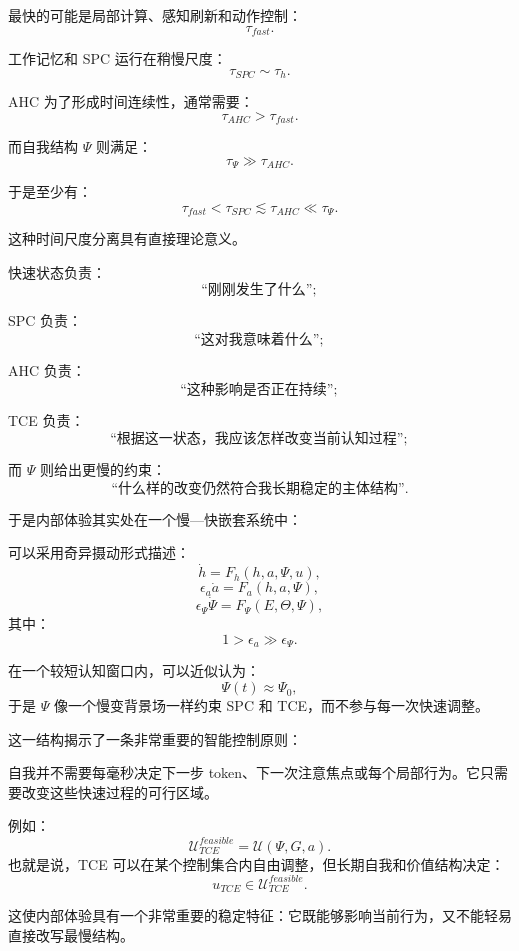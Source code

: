 最快的可能是局部计算、感知刷新和动作控制：
\[
\tau_{fast}.
\]

工作记忆和 SPC 运行在稍慢尺度：
\[
\tau_{SPC}
\sim
\tau_h.
\]

AHC 为了形成时间连续性，通常需要：
\[
\tau_{AHC}
>
\tau_{fast}.
\]

而自我结构 $\Psi$ 则满足：
\[
\tau_{\Psi}
\gg
\tau_{AHC}.
\]

于是至少有：
\[
\boxed{
\tau_{fast}
<
\tau_{SPC}
\lesssim
\tau_{AHC}
\ll
\tau_{\Psi}.
}
\]

这种时间尺度分离具有直接理论意义。

快速状态负责：
\[
\text{``刚刚发生了什么''};
\]

SPC 负责：
\[
\text{``这对我意味着什么''};
\]

AHC 负责：
\[
\text{``这种影响是否正在持续''};
\]

TCE 负责：
\[
\text{``根据这一状态，我应该怎样改变当前认知过程''};
\]

而 $\Psi$ 则给出更慢的约束：
\[
\text{``什么样的改变仍然符合我长期稳定的主体结构''}.
\]

于是内部体验其实处在一个慢—快嵌套系统中：
\begin{statementbox}
\centering
{}
\end{statementbox}

可以采用奇异摄动形式描述：
\[
\dot h
=
F_h
(h,a,\Psi,u),
\]
\[
\epsilon_a\dot a
=
F_a
(h,a,\Psi),
\]
\[
\epsilon_\Psi\dot\Psi
=
F_\Psi
(E,\Theta,\Psi),
\]
其中：
\[
1
>
\epsilon_a
\gg
\epsilon_\Psi.
\]

在一个较短认知窗口内，可以近似认为：
\[
\Psi(t)\approx\Psi_0,
\]
于是 $\Psi$ 像一个慢变背景场一样约束 SPC 和 TCE，而不参与每一次快速调整。

这一结构揭示了一条非常重要的智能控制原则：
\begin{statementbox}
\centering
{}
\end{statementbox}
自我并不需要每毫秒决定下一步 token、下一次注意焦点或每个局部行为。它只需要改变这些快速过程的可行区域。

例如：
\[
\mathcal U_{TCE}^{feasible}
=
\mathcal U
(\Psi,G,a).
\]
也就是说，TCE 可以在某个控制集合内自由调整，但长期自我和价值结构决定：
\[
u_{TCE}\in\mathcal U_{TCE}^{feasible}.
\]

这使内部体验具有一个非常重要的稳定特征：它既能够影响当前行为，又不能轻易直接改写最慢结构。

